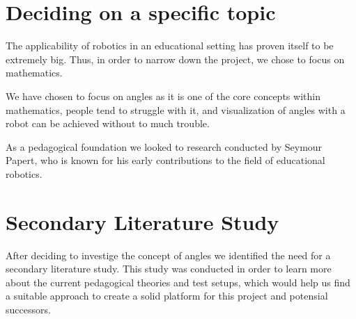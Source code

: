 \section{Deciding on a specific topic}
The applicability of robotics in an educational setting has proven itself to be extremely big. Thus, in order to narrow down the project, we chose to focus on mathematics. 

\bigskip\noindent
We have chosen to focus on angles as it is one of the core concepts within mathematics, people tend to struggle with it, and visualization of angles with a robot can be achieved without to much trouble. 

\bigskip\noindent
As a pedagogical foundation we looked to research conducted by Seymour Papert, who is known for his early contributions to the field of educational robotics.

\section{Secondary Literature Study}
After deciding to investige the concept of angles we identified the need for a secondary literature study. 
This study was conducted in order to learn more about the current pedagogical theories and test setups, which would help us find a suitable approach to create a solid platform for this project and potensial successors.



